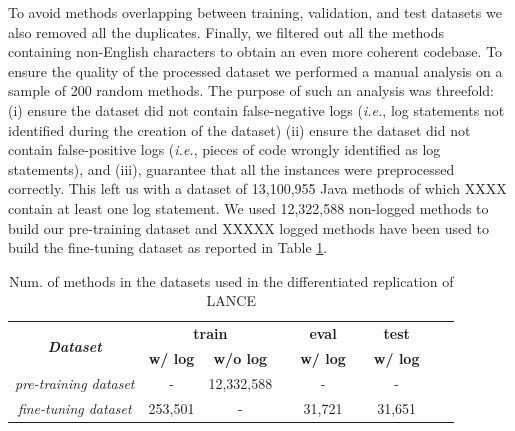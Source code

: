To avoid methods overlapping between training, validation, and test datasets we also removed all the duplicates. 
Finally, we filtered out all the methods containing non-English characters to obtain an even more coherent codebase. 
To ensure the quality of the processed dataset we performed a manual analysis on a sample of 200 random methods. 
The purpose of such an analysis was threefold: (i) ensure  the dataset did not contain false-negative logs (\emph{i.e.}, log statements not identified during the creation of the dataset) (ii) ensure the dataset did not contain false-positive logs (\emph{i.e.}, pieces of code wrongly identified as log statements), and (iii), guarantee that all the instances were preprocessed correctly.
This left us with a dataset of 13,100,955 Java methods of which XXXX contain at least one log statement. We used 12,322,588 non-logged \java methods to build our pre-training dataset and XXXXX logged \java methods have been used to build the fine-tuning dataset as reported in Table \ref{tab:ds-summary-1}. 

\begin{table}[h]
	\centering
	\caption{Num. of methods in the datasets used in the differentiated replication of LANCE}
	\begin{tabular}{ccccccccc}
		\hline
		\multirow{2}{*}{\textit{\textbf{Dataset}}} & \multicolumn{2}{c}{\textbf{train}} & \textbf{} & \textbf{eval} & \textbf{} & \textbf{test}  \\ \cline{2-3} \cline{5-5} \cline{7-7} 
		& \textbf{w/ log} & \textbf{w/o log} & \textbf{} & \textbf{w/ log} & \textbf{} & \textbf{w/ log} \\ \hline
		\textit{pre-training dataset}              & -               &      12,332,588  &           & -               &           &  -               \\
		\textit{fine-tuning dataset}               & 253,501         & -                &           & 31,721          &           & 31,651          \\ \hline
	\end{tabular}
	\label{tab:ds-summary-1}
\end{table}



